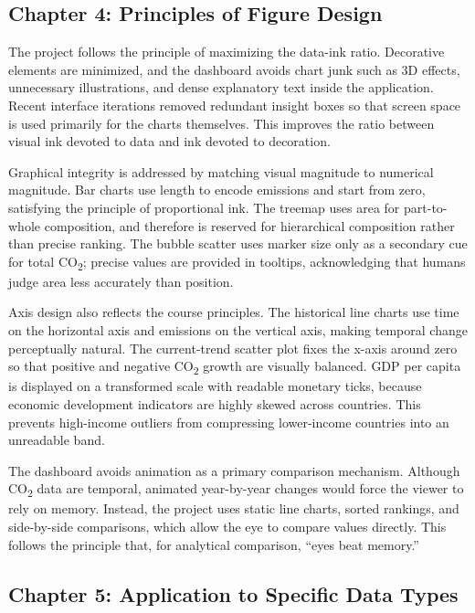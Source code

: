 \documentclass[a4paper,12pt]{article}
\begin{document}
\subsection{Chapter 4: Principles of Figure Design}

The project follows the principle of maximizing the data-ink ratio. Decorative elements
are minimized, and the dashboard avoids chart junk such as 3D effects, unnecessary
illustrations, and dense explanatory text inside the application. Recent interface
iterations removed redundant insight boxes so that screen space is used primarily for the
charts themselves. This improves the ratio between visual ink devoted to data and ink
devoted to decoration.

Graphical integrity is addressed by matching visual magnitude to numerical magnitude.
Bar charts use length to encode emissions and start from zero, satisfying the principle
of proportional ink. The treemap uses area for part-to-whole composition, and therefore
is reserved for hierarchical composition rather than precise ranking. The bubble scatter
uses marker size only as a secondary cue for total CO\textsubscript{2}; precise values are
provided in tooltips, acknowledging that humans judge area less accurately than position.

Axis design also reflects the course principles. The historical line charts use time on
the horizontal axis and emissions on the vertical axis, making temporal change perceptually
natural. The current-trend scatter plot fixes the x-axis around zero so that positive and
negative CO\textsubscript{2} growth are visually balanced. GDP per capita is displayed on
a transformed scale with readable monetary ticks, because economic development indicators
are highly skewed across countries. This prevents high-income outliers from compressing
lower-income countries into an unreadable band.

The dashboard avoids animation as a primary comparison mechanism. Although CO\textsubscript{2}
data are temporal, animated year-by-year changes would force the viewer to rely on memory.
Instead, the project uses static line charts, sorted rankings, and side-by-side comparisons,
which allow the eye to compare values directly. This follows the principle that, for
analytical comparison, ``eyes beat memory.''

\subsection{Chapter 5: Application to Specific Data Types}
\end{document}

